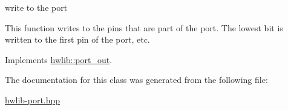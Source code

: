 write to the port 

This function writes to the pins that are part of the port. The lowest bit is written to the first pin of the port, etc. 

Implements \hyperlink{classhwlib_1_1port__out_ad086f5dd66f293118df6ab979feb64fc}{hwlib\+::port\+\_\+out}.



The documentation for this class was generated from the following file\+:\begin{DoxyCompactItemize}
\item 
\hyperlink{hwlib-port_8hpp}{hwlib-\/port.\+hpp}\end{DoxyCompactItemize}
